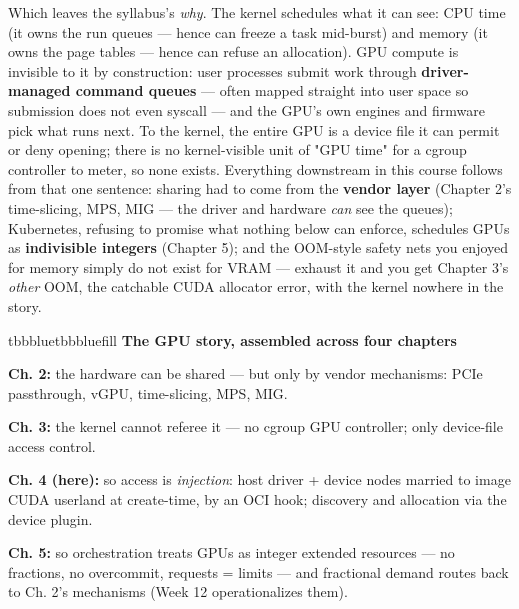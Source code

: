 Which leaves the syllabus's \textit{why}. The kernel schedules what it can see: CPU time (it owns the run queues — hence  can freeze a task mid-burst) and memory (it owns the page tables — hence  can refuse an allocation). GPU compute is invisible to it by construction: user processes submit work through \textbf{driver-managed command queues} — often mapped straight into user space so submission does not even syscall — and the GPU's own engines and firmware pick what runs next. To the kernel, the entire GPU is a device file it can permit or deny opening; there is no kernel-visible unit of "GPU time" for a cgroup controller to meter, so none exists. Everything downstream in this course follows from that one sentence: sharing had to come from the \textbf{vendor layer} (Chapter 2's time-slicing, MPS, MIG — the driver and hardware \textit{can} see the queues); Kubernetes, refusing to promise what nothing below can enforce, schedules GPUs as \textbf{indivisible integers} (Chapter 5); and the OOM-style safety nets you enjoyed for memory simply do not exist for VRAM — exhaust it and you get Chapter 3's \textit{other} OOM, the catchable CUDA allocator error, with the kernel nowhere in the story.

\begin{calloutbox}{tbbblue}{tbbbluefill}
{\normalsize\bfseries\color{tbbblue}The GPU story, assembled across four chapters}\par\vspace{3pt}
\begin{tbbitemize}
  \item \textbf{Ch. 2:} the hardware can be shared — but only by vendor mechanisms: PCIe passthrough, vGPU, time-slicing, MPS, MIG.
  \item \textbf{Ch. 3:} the kernel cannot referee it — no cgroup GPU controller; only device-file access control.
  \item \textbf{Ch. 4 (here):} so access is \textit{injection}: host driver + device nodes married to image CUDA userland at create-time, by an OCI hook; discovery and allocation via the device plugin.
  \item \textbf{Ch. 5:} so orchestration treats GPUs as integer extended resources — no fractions, no overcommit, requests = limits — and fractional demand routes back to Ch. 2's mechanisms (Week 12 operationalizes them).
\end{tbbitemize}
\end{calloutbox}

\vspace{3.0pt}

